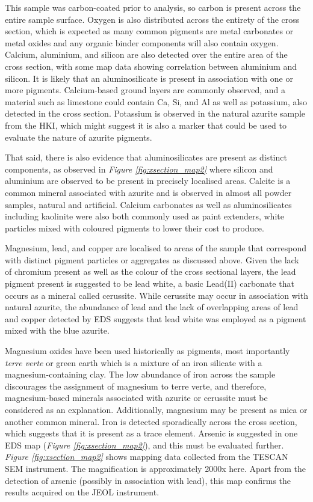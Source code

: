 This sample was carbon-coated prior to analysis, so carbon is present across the entire sample surface. Oxygen is also distributed across the entirety of the cross section, which is expected as many common pigments are metal carbonates or metal oxides and any organic binder components will also contain oxygen. Calcium, aluminium, and silicon are also detected over the entire area of the cross section, with some map data showing correlation between aluminium and silicon. It is likely that an aluminosilicate is present in association with one or more pigments. Calcium-based ground layers are commonly observed, and a material such as limestone could contain Ca, Si, and Al as well as potassium, also detected in the cross section. Potassium is observed in the natural azurite sample from the HKI, which might suggest it is also a marker that could be used to evaluate the nature of azurite pigments.

That said, there is also evidence that aluminosilicates are present as distinct components, as observed in \textit{Figure \ref{fig:xsection_map2}} where silicon and aluminium are observed to be present in precisely localised areas. Calcite is a common mineral associated with azurite and is observed in almost all powder samples, natural and artificial. Calcium carbonates as well as aluminosilicates including kaolinite were also both commonly used as paint extenders, white particles mixed with coloured pigments to lower their cost to produce.~\autocite{Townsend}

Magnesium, lead, and copper are localised to areas of the sample that correspond with distinct pigment particles or aggregates as discussed above. Given the lack of chromium present as well as the colour of the cross sectional layers, the lead pigment present is suggested to be lead white, a basic Lead(II) carbonate that occurs as a mineral called cerussite. While cerussite may occur in association with natural azurite,\autocite{Aru} the abundance of lead and the lack of overlapping areas of lead and copper detected by EDS suggests that lead white was employed as a pigment mixed with the blue azurite.

Magnesium oxides have been used historically as pigments, most importantly \textit{terre verte} or green earth which is a mixture of an iron silicate with a magnesium-containing clay. The low abundance of iron across the sample discourages the assignment of magnesium to terre verte, and therefore, magnesium-based minerals associated with azurite or cerussite must be considered as an explanation. Additionally, magnesium may be present as mica or another common mineral. Iron is detected sporadically across the cross section, which suggests that it is present as a trace element. Arsenic is suggested in one EDS map (\textit{Figure \ref{fig:xsection_map2}}), and this must be evaluated further. \textit{Figure \ref{fig:xsection_map2}} shows mapping data collected from the TESCAN SEM instrument. The magnification is approximately 2000x here. Apart from the detection of arsenic (possibly in association with lead), this map confirms the results acquired on the JEOL instrument.


